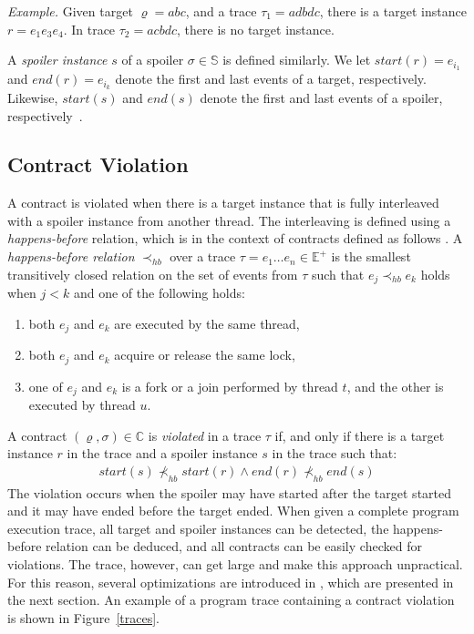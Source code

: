 \emph{Example.} Given target $\varrho = abc$, and a trace $\tau_1 = adbdc$,
there is a target instance $r = e_1 e_3 e_4$. In trace $\tau_2 = acbdc$, there
is no target instance.

A \emph{spoiler instance} $s$ of a spoiler $\sigma \in \mathbb{S}$ is defined
similarly. We let $start(r) = e_{i_1}$ and $end(r) = e_{i_k}$ denote the first
and last events of a target, respectively. Likewise, $start(s)$ and $end(s)$
denote the first and last events of a spoiler, respectively~\cite{contracts}.

\subsection{Contract Violation}

A contract is violated when there is a target instance that is fully interleaved
with a spoiler instance from another thread. The interleaving is defined using a
\emph{happens-before} relation, which is in the context of contracts defined as
follows \cite{contracts}. A \emph{happens-before relation} $\prec_{hb}$ over a
trace $\tau = e_1 \ldots e_n \in \mathbb{E}^+$ is the smallest transitively
closed relation on the set of events from $\tau$ such that $e_j \prec_{hb} e_k$
holds when $j < k$ and one of the following holds:
\begin{enumerate}
    \item both $e_j$ and $e_k$ are executed by the same thread,
    \item both $e_j$ and $e_k$ acquire or release the same lock,
    \item one of $e_j$ and $e_k$ is a fork or a join performed by thread $t$,
        and the other is executed by thread $u$.
\end{enumerate}

A contract $(\varrho,\sigma) \in \mathbb{C}$ is \emph{violated} in a trace
$\tau$ if, and only if there is a target instance $r$ in the trace and a spoiler
instance $s$ in the trace such that:
\begin{align*}
    start(s) \nprec_{hb} start(r) \wedge end(r) \nprec_{hb} end(s)
\end{align*}
The violation occurs when the spoiler may have started after the target started
and it may have ended before the target ended. When given a complete program
execution trace, all target and spoiler instances can be detected, the
happens-before relation can be deduced, and all contracts can be easily checked
for violations. The trace, however, can get large and make this approach
unpractical. For this reason, several optimizations are introduced in
\cite{contracts}, which are presented in the next section. An example of a
program trace containing a contract violation is shown in Figure~\ref{traces}.

